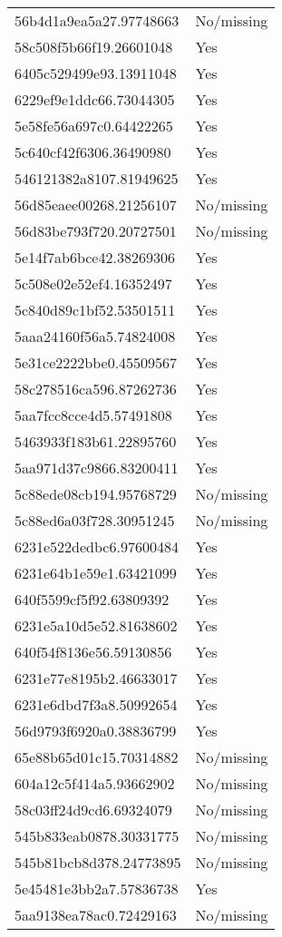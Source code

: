 \begin{tabular}{ll}
56b4d1a9ea5a27.97748663 & No/missing \\
58c508f5b66f19.26601048 & Yes \\
6405c529499e93.13911048 & Yes \\
6229ef9e1ddc66.73044305 & Yes \\
5e58fe56a697c0.64422265 & Yes \\
5c640cf42f6306.36490980 & Yes \\
546121382a8107.81949625 & Yes \\
56d85eaee00268.21256107 & No/missing \\
56d83be793f720.20727501 & No/missing \\
5e14f7ab6bce42.38269306 & Yes \\
5c508e02e52ef4.16352497 & Yes \\
5c840d89c1bf52.53501511 & Yes \\
5aaa24160f56a5.74824008 & Yes \\
5e31ce2222bbe0.45509567 & Yes \\
58c278516ca596.87262736 & Yes \\
5aa7fcc8cce4d5.57491808 & Yes \\
5463933f183b61.22895760 & Yes \\
5aa971d37c9866.83200411 & Yes \\
5c88ede08cb194.95768729 & No/missing \\
5c88ed6a03f728.30951245 & No/missing \\
6231e522dedbc6.97600484 & Yes \\
6231e64b1e59e1.63421099 & Yes \\
640f5599cf5f92.63809392 & Yes \\
6231e5a10d5e52.81638602 & Yes \\
640f54f8136e56.59130856 & Yes \\
6231e77e8195b2.46633017 & Yes \\
6231e6dbd7f3a8.50992654 & Yes \\
56d9793f6920a0.38836799 & Yes \\
65e88b65d01c15.70314882 & No/missing \\
604a12c5f414a5.93662902 & No/missing \\
58c03ff24d9cd6.69324079 & No/missing \\
545b833eab0878.30331775 & No/missing \\
545b81bcb8d378.24773895 & No/missing \\
5e45481e3bb2a7.57836738 & Yes \\
5aa9138ea78ac0.72429163 & No/missing \\

\end{tabular}
